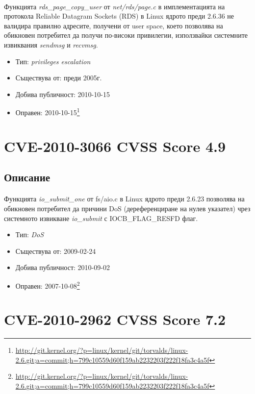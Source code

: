 \documentclass[a4paper,12pt,leqno]{article}
\begin{document}
\paragraph{}
Функцията \textit{rds\_page\_copy\_user} от  \textit{net/rds/page.c} в имплементацията на протокола Reliable Datagram Sockets (RDS) в Linux ядрото преди 2.6.36 не валидира правилно адресите, получени от user space, което позволява на обикновен потребител да получи по-високи привилегии, използвайки системните извиквания \textit{sendmsg} и \textit{recvmsg}.
\begin{itemize}
    \item Тип: \textit{privileges escalation}
    \item Съществува от: преди 2005г.
  	\item Добива публичност: 2010-10-15
    \item Оправен: 2010-10-15\footnote{\url{http://git.kernel.org/?p=linux/kernel/git/torvalds/linux-2.6.git;a=commit;h=799c10559d60f159ab2232203f222f18fa3c4a5f}}
\end{itemize}

\section{CVE-2010-3066 CVSS Score 4.9}
\subsection{Описание}
\paragraph{}
Функцията \textit{io\_submit\_one} от fs/aio.c в Linux ядрото преди 2.6.23 позволява на обикновен потребител да причини DoS (дереференциране на нулев указател) чрез системното извикване \textit{io\_submit} с IOCB\_FLAG\_RESFD флаг.

\begin{itemize}
    \item Тип: \textit{DoS}
    \item Съществува от: 2009-02-24
  	\item Добива публичност: 2010-09-02
    \item Оправен: 2007-10-08\footnote{\url{http://git.kernel.org/?p=linux/kernel/git/torvalds/linux-2.6.git;a=commit;h=799c10559d60f159ab2232203f222f18fa3c4a5f}}
\end{itemize}

\section{CVE-2010-2962 CVSS Score 7.2}
\end{document}

